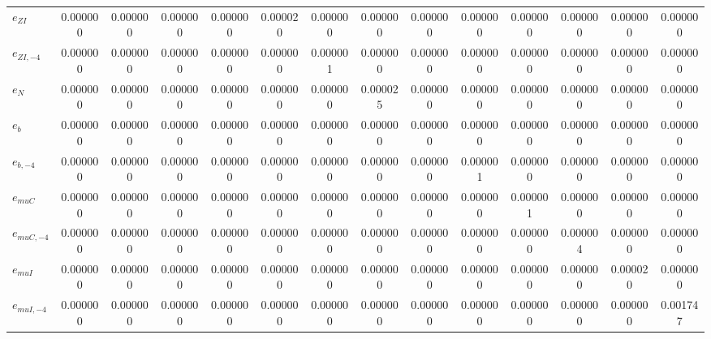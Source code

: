 \begin{center}
\begin{longtable}{lccccccccccccc}
${e_{ZI}}      $	 & 	        0.000000	 & 	        0.000000	 & 	        0.000000	 & 	        0.000000	 & 	        0.000020	 & 	        0.000000	 & 	        0.000000	 & 	        0.000000	 & 	        0.000000	 & 	        0.000000	 & 	        0.000000	 & 	        0.000000	 & 	        0.000000 \\ 
${e_{ZI,-4}}   $	 & 	        0.000000	 & 	        0.000000	 & 	        0.000000	 & 	        0.000000	 & 	        0.000000	 & 	        0.000001	 & 	        0.000000	 & 	        0.000000	 & 	        0.000000	 & 	        0.000000	 & 	        0.000000	 & 	        0.000000	 & 	        0.000000 \\ 
${e_N}         $	 & 	        0.000000	 & 	        0.000000	 & 	        0.000000	 & 	        0.000000	 & 	        0.000000	 & 	        0.000000	 & 	        0.000025	 & 	        0.000000	 & 	        0.000000	 & 	        0.000000	 & 	        0.000000	 & 	        0.000000	 & 	        0.000000 \\ 
${e_b}         $	 & 	        0.000000	 & 	        0.000000	 & 	        0.000000	 & 	        0.000000	 & 	        0.000000	 & 	        0.000000	 & 	        0.000000	 & 	        0.000000	 & 	        0.000000	 & 	        0.000000	 & 	        0.000000	 & 	        0.000000	 & 	        0.000000 \\ 
${e_{b,-4}}    $	 & 	        0.000000	 & 	        0.000000	 & 	        0.000000	 & 	        0.000000	 & 	        0.000000	 & 	        0.000000	 & 	        0.000000	 & 	        0.000000	 & 	        0.000001	 & 	        0.000000	 & 	        0.000000	 & 	        0.000000	 & 	        0.000000 \\ 
${e_{muC}}     $	 & 	        0.000000	 & 	        0.000000	 & 	        0.000000	 & 	        0.000000	 & 	        0.000000	 & 	        0.000000	 & 	        0.000000	 & 	        0.000000	 & 	        0.000000	 & 	        0.000001	 & 	        0.000000	 & 	        0.000000	 & 	        0.000000 \\ 
${e_{muC,-4}}  $	 & 	        0.000000	 & 	        0.000000	 & 	        0.000000	 & 	        0.000000	 & 	        0.000000	 & 	        0.000000	 & 	        0.000000	 & 	        0.000000	 & 	        0.000000	 & 	        0.000000	 & 	        0.000004	 & 	        0.000000	 & 	        0.000000 \\ 
${e_{muI}}     $	 & 	        0.000000	 & 	        0.000000	 & 	        0.000000	 & 	        0.000000	 & 	        0.000000	 & 	        0.000000	 & 	        0.000000	 & 	        0.000000	 & 	        0.000000	 & 	        0.000000	 & 	        0.000000	 & 	        0.000020	 & 	        0.000000 \\ 
${e_{muI,-4}}  $	 & 	        0.000000	 & 	        0.000000	 & 	        0.000000	 & 	        0.000000	 & 	        0.000000	 & 	        0.000000	 & 	        0.000000	 & 	        0.000000	 & 	        0.000000	 & 	        0.000000	 & 	        0.000000	 & 	        0.000000	 & 	        0.001747 \\ 
\end{longtable}
 \end{center}
